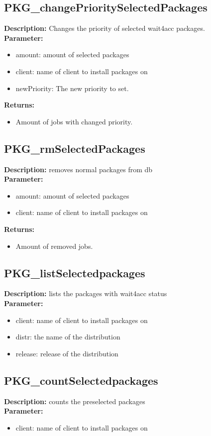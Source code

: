 \subsection{PKG\_changePrioritySelectedPackages}
\textbf{Description:} Changes the priority of selected wait4acc packages.\\
\textbf{Parameter:}
\begin{itemize}
\item amount: amount of selected packages
\item client: name of client to install packages on
\item newPriority: The new priority to set.
\end{itemize}
\textbf{Returns:}
\begin{itemize}
\item Amount of jobs with changed priority.
\end{itemize}

\subsection{PKG\_rmSelectedPackages}
\textbf{Description:} removes normal packages from db\\
\textbf{Parameter:}
\begin{itemize}
\item amount: amount of selected packages
\item client: name of client to install packages on
\end{itemize}
\textbf{Returns:}
\begin{itemize}
\item Amount of removed jobs.
\end{itemize}

\subsection{PKG\_listSelectedpackages}
\textbf{Description:} lists the packages with wait4acc status\\
\textbf{Parameter:}
\begin{itemize}
\item client: name of client to install packages on
\item distr: the name of the distribution
\item release: release of the distribution
\end{itemize}

\subsection{PKG\_countSelectedpackages}
\textbf{Description:} counts the preselected packages\\
\textbf{Parameter:}
\begin{itemize}
\item client: name of client to install packages on
\end{itemize}

